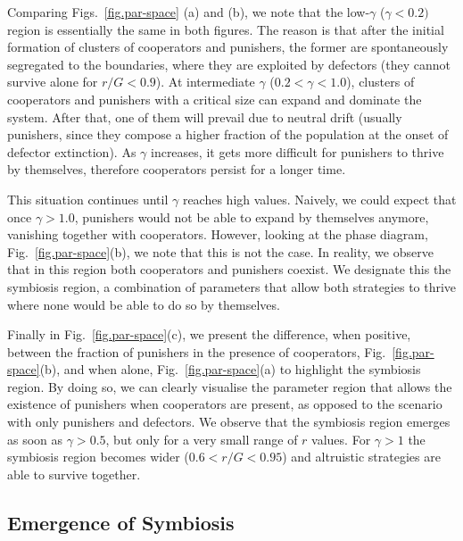 \documentclass[5p]{elsarticle}
\begin{document}
Comparing Figs.~\ref{fig.par-space} (a) and (b), we note that the low-$\gamma$ ($\gamma<0.2)$ region is essentially the same in both figures. The reason is that after the initial formation of clusters of cooperators and punishers, the former are spontaneously segregated to the boundaries, where they are exploited by defectors (they cannot survive alone for $r/G<0.9$). At intermediate $\gamma$ ($0.2<\gamma<1.0$), clusters of cooperators and punishers with a critical size can expand and dominate the system. After that, one of them will prevail due to neutral drift (usually punishers, since they compose a higher fraction of the population at the onset of defector extinction). As $\gamma$ increases, it gets more difficult for punishers to thrive by themselves, therefore cooperators persist for a longer time.


This situation continues until $\gamma$ reaches high values. Naively, we could expect that once $\gamma>1.0$, punishers would not be able to expand by themselves anymore, vanishing together with cooperators. However, looking at the phase diagram, Fig.~\ref{fig.par-space}(b), we note that this is not the case. In reality, we observe that in this region both cooperators and punishers coexist. We designate this the symbiosis region, a combination of parameters that allow both strategies to thrive where none would be able to do so by themselves. 

%
Finally in Fig.~\ref{fig.par-space}(c), we present the difference, when positive, between the fraction of punishers in the presence of cooperators, Fig.~\ref{fig.par-space}(b), and when alone, Fig.~\ref{fig.par-space}(a) to highlight the symbiosis region.
%
By doing so, we can clearly visualise the parameter region that allows the existence of punishers when cooperators are present, as opposed to the scenario with only punishers and defectors. We observe that the symbiosis region emerges as soon as $\gamma>0.5$, but only for a very small range of $r$ values. For $\gamma>1$ the symbiosis region becomes wider ($0.6<r/G<0.95$) and altruistic strategies are able to survive together.

\subsection{Emergence of Symbiosis}
\label{sec.symbiosis}
\end{document}
